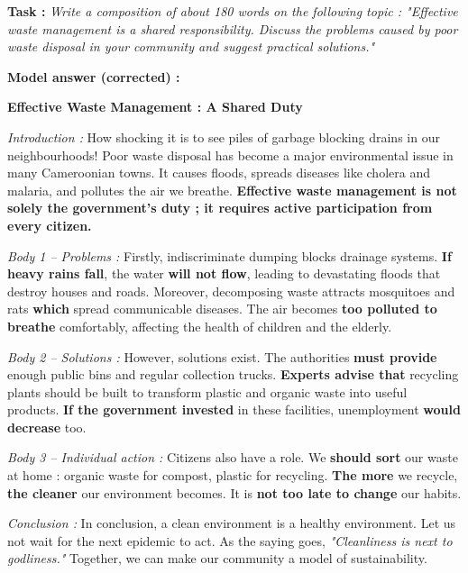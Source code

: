 \documentclass[11pt]{article}
\begin{document}
\begin{exoresolu}
\textbf{Task :} \textit{Write a composition of about 180 words on the following topic : "Effective waste management is a shared responsibility. Discuss the problems caused by poor waste disposal in your community and suggest practical solutions."}

\tcblower
\textbf{Model answer (corrected) :}

\textbf{Effective Waste Management : A Shared Duty}

\textit{Introduction :} How shocking it is to see piles of garbage blocking drains in our neighbourhoods! Poor waste disposal has become a major environmental issue in many Cameroonian towns. It causes floods, spreads diseases like cholera and malaria, and pollutes the air we breathe. \textbf{Effective waste management is not solely the government's duty ; it requires active participation from every citizen.}

\textit{Body 1 -- Problems :} Firstly, indiscriminate dumping blocks drainage systems. \textbf{If heavy rains fall}, the water \textbf{will not flow}, leading to devastating floods that destroy houses and roads. Moreover, decomposing waste attracts mosquitoes and rats \textbf{which} spread communicable diseases. The air becomes \textbf{too polluted to breathe} comfortably, affecting the health of children and the elderly.

\textit{Body 2 -- Solutions :} However, solutions exist. The authorities \textbf{must provide} enough public bins and regular collection trucks. \textbf{Experts advise that} recycling plants should be built to transform plastic and organic waste into useful products. \textbf{If the government invested} in these facilities, unemployment \textbf{would decrease} too.

\textit{Body 3 -- Individual action :} Citizens also have a role. We \textbf{should sort} our waste at home : organic waste for compost, plastic for recycling. \textbf{The more} we recycle, \textbf{the cleaner} our environment becomes. It is \textbf{not too late to change} our habits.

\textit{Conclusion :} In conclusion, a clean environment is a healthy environment. Let us not wait for the next epidemic to act. As the saying goes, \textit{"Cleanliness is next to godliness."} Together, we can make our community a model of sustainability.


\end{exoresolu}
\end{document}
